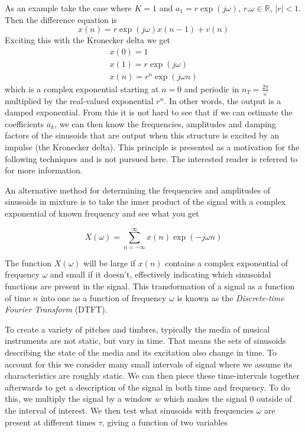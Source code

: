 As an example take the case where $K=1$ and $a_1 = r \exp(j\omega)$, 
$r\text{,}\omega \in \mathbb{R}$, $|r|<1$. Then the difference equation is
\begin{equation}
    x(n) = r \exp(j\omega) x(n-1) + v(n)
\end{equation}
Exciting this with the Kronecker delta we get
\begin{equation}
    \begin{array}{c}
        x(0) = 1 \\
        x(1) = r \exp(j\omega) \\
        x(n) = r^n \exp(j\omega n)
    \end{array}
\end{equation}
which is a complex exponential starting at $n=0$ and periodic in
$n_T=\frac{2\pi}{\omega}$ multiplied by the real-valued
exponential $r^n$. In other words, the output is a damped exponential. From this
it is not hard to see that if we can estimate the coefficients $a_k$, we can
then know the frequencies, amplitudes and damping factors of the sinusoids that
are output when this structure is excited by an impulse (the Kronecker delta).
This principle is presented as a motivation for the following techniques and is
not pursued here. The interested reader is referred to \cite{makhoul1975linear}
for more information.

An alternative method for determining the frequencies and amplitudes of
sinusoids in mixture is to take the inner product of the signal with a complex
exponential of known frequency and see what you get

\begin{equation}
    X(\omega) = \sum_{n=-\infty}^{\infty} x(n) \exp(-j \omega n)
\end{equation}

The function $X(\omega)$ will be large if $x(n)$ contains a complex exponential of
frequency $\omega$ and small if it doesn't, effectively indicating which
sinusoidal functions are present in the signal. This transformation of a signal
as a function of time $n$ into one as a function of frequency $\omega$ is known
as the \textit{Discrete-time Fourier Transform} (DTFT). 

To create a variety of pitches and timbres, typically the media of musical
instruments are not static, but vary in time. That means the sets of sinusoids
describing the state of the media and its excitation also change in time. To
account for this we consider many small intervals of signal where we assume its
characteristics are roughly static. We can then piece these time-intervals
together afterwards to get a description of the signal in both time and
frequency. To do this, we multiply the signal by a window $w$ which makes the signal
0 outside of the interval of interest. We then test what sinusoids with
frequencies $\omega$ are present at different times $\tau$, giving a function of
two variables


